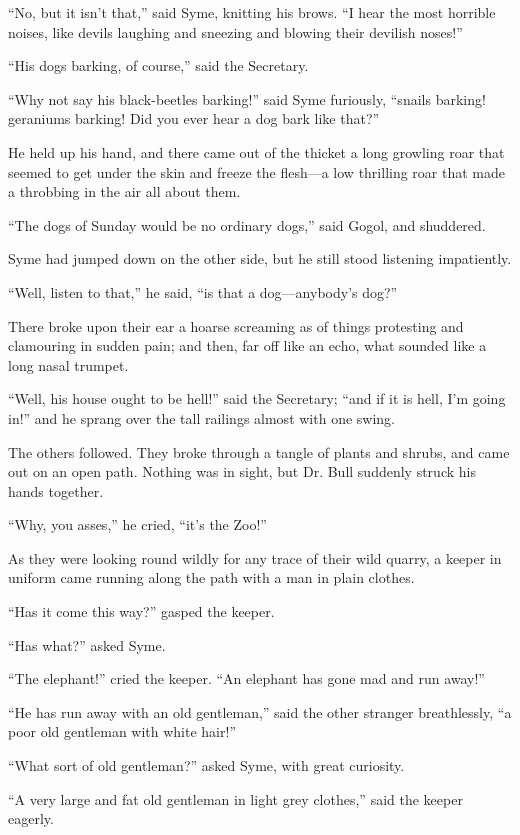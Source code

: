 “No, but it isn’t that,” said Syme, knitting his brows. “I hear the most horrible noises, like devils laughing and sneezing and blowing their devilish noses!”

“His dogs barking, of course,” said the Secretary.

“Why not say his black-beetles barking!” said Syme furiously, “snails barking! geraniums barking! Did you ever hear a dog bark like that?”

He held up his hand, and there came out of the thicket a long growling roar that seemed to get under the skin and freeze the flesh⁠—a low thrilling roar that made a throbbing in the air all about them.

“The dogs of Sunday would be no ordinary dogs,” said Gogol, and shuddered.

Syme had jumped down on the other side, but he still stood listening impatiently.

“Well, listen to that,” he said, “is that a dog⁠—anybody’s dog?”

There broke upon their ear a hoarse screaming as of things protesting and clamouring in sudden pain; and then, far off like an echo, what sounded like a long nasal trumpet.

“Well, his house ought to be hell!” said the Secretary; “and if it is hell, I’m going in!” and he sprang over the tall railings almost with one swing.

The others followed. They broke through a tangle of plants and shrubs, and came out on an open path. Nothing was in sight, but Dr. Bull suddenly struck his hands together.

“Why, you asses,” he cried, “it’s the Zoo!”

As they were looking round wildly for any trace of their wild quarry, a keeper in uniform came running along the path with a man in plain clothes.

“Has it come this way?” gasped the keeper.

“Has what?” asked Syme.

“The elephant!” cried the keeper. “An elephant has gone mad and run away!”

“He has run away with an old gentleman,” said the other stranger breathlessly, “a poor old gentleman with white hair!”

“What sort of old gentleman?” asked Syme, with great curiosity.

“A very large and fat old gentleman in light grey clothes,” said the keeper eagerly.

